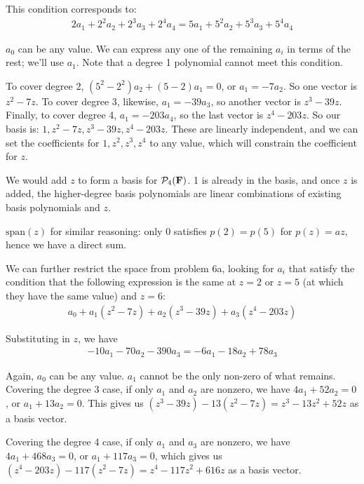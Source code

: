 \documentclass{article}
\begin{document}

This condition corresponds to:
\begin{align*}
  2a_1 + 2^2a_2 + 2^3a_3 + 2^4a_4 = 5a_1 + 5^2a_2 + 5^3a_3 + 5^4a_4
\end{align*}

$a_0$ can be any value. We can express any one of the remaining $a_i$ in terms
of the rest; we'll use $a_1$. Note that a degree 1 polynomial cannot meet this
condition.

To cover degree 2, $(5^2-2^2)a_2 + (5-2)a_1 = 0$, or $a_1 = -7a_2$. So one
vector is $z^2 - 7z$. To cover degree 3, likewise, $a_1 = -39a_3$, so another
vector is $z^3 - 39z$. Finally, to cover degree 4, $a_1 = -203a_4$, so the last
vector is $z^4 - 203z$. So our basis is: $1, z^2-7z, z^3-39z, z^4-203z$. These
are linearly independent, and we can set the coefficients for $1, z^2, z^3, z^4$
to any value, which will constrain the coefficient for $z$.


We would add $z$ to form a basis for $\mathcal{P}_4(\mathbf{F})$. 1 is already in
the basis, and once $z$ is added, the higher-degree basis polynomials are linear
combinations of existing basis polynomials and $z$.


$\text{span}(z)$ for similar reasoning: only 0 satisfies $p(2) = p(5)$ for $p(z)
= az$, hence we have a direct sum.


We can further restrict the space from problem 6a, looking for $a_i$ that
satisfy the condition that the following expression is the same at $z = 2$ or $z
= 5$ (at which they have the same value) and $z = 6$:
\begin{align}
  a_0 + a_1(z^2-7z) + a_2(z^3 - 39z) + a_3(z^4 - 203z)
\end{align}

Substituting in $z$, we have
\begin{align}
  -10a_1 - 70a_2 - 390a_3 = -6a_1 - 18a_2 + 78a_3
\end{align}

Again, $a_0$ can be any value. $a_1$ cannot be the only non-zero of what
remains. Covering the degree 3 case, if only $a_1$ and $a_2$ are nonzero, we
have $4a_1 + 52a_2 = 0$, or $a_1 + 13a_2 = 0$. This gives us $(z^3 - 39z) -
13(z^2 - 7z) = z^3 - 13z^2 + 52z$ as a basis vector.

Covering the degree 4 case, if only $a_1$ and $a_3$ are nonzero, we have $4a_1 +
468a_3 = 0$, or $a_1 + 117a_3 = 0$, which gives us $(z^4 - 203z) - 117(z^2 - 7z)
= z^4 - 117z^2 + 616z$ as a basis vector.
\end{document}
